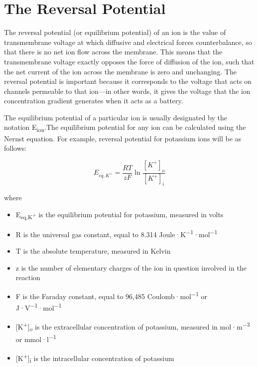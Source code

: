 \hypertarget{the-reversal-potential}{%
\section{The Reversal Potential}\label{the-reversal-potential}}

The reversal potential (or equilibrium potential) of an ion is the value of transmembrane voltage at which diffusive and electrical forces counterbalance, so that there is no net ion flow across the membrane. This means that the transmembrane voltage exactly opposes the force of diffusion of the ion, such that the net current of the ion across the membrane is zero and unchanging. The reversal potential is important because it corresponds to the voltage that acts on channels permeable to that ion---in other words, it gives the voltage that the ion concentration gradient generates when it acts as a battery.

The equilibrium potential of a particular ion is usually designated by the notation E\textsubscript{ion}.The equilibrium potential for any ion can be calculated using the Nernst equation. For example, reversal potential for potassium ions will be as follows:

\[  E_{eq,K^+} = \frac{RT}{zF} \ln \frac{[K^+]_{o}}{[K^+]_{i}} \]

where

\begin{itemize}
\tightlist
\item
  E\textsubscript{eq,K\textsuperscript{+}} is the equilibrium potential for potassium, measured in volts
\item
  R is the universal gas constant, equal to 8.314 Joule·K\textsuperscript{−1}·mol\textsuperscript{−1}
\item
  T is the absolute temperature, measured in Kelvin
\item
  z is the number of elementary charges of the ion in question involved in the reaction
\item
  F is the Faraday constant, equal to 96,485 Coulomb·mol\textsuperscript{−1} or J·V\textsuperscript{−1}·mol\textsuperscript{−1}
\item
  {[}K\textsuperscript{+}{]}\textsubscript{o} is the extracellular concentration of potassium, measured in mol·m\textsuperscript{−3} or mmol·l\textsuperscript{−1}
\item
  {[}K\textsuperscript{+}{]}\textsubscript{i} is the intracellular concentration of potassium
\end{itemize}

